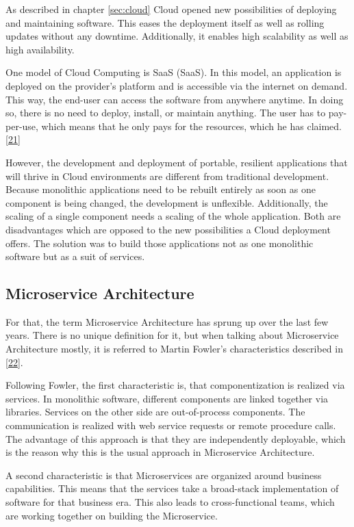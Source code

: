 \documentclass[12pt,english,a4paper,oneside,,tablecaptionabove]{scrbook}
\begin{document}
As described in chapter \ref{sec:cloud} Cloud opened new possibilities
of deploying and maintaining software. This eases the deployment itself
as well as rolling updates without any downtime. Additionally, it
enables high scalability as well as high availability.

One model of Cloud Computing is \acl{SaaS} (\acs{SaaS}). In this model,
an application is deployed on the provider's platform and is accessible
via the internet on demand. This way, the end-user can access the
software from anywhere anytime. In doing so, there is no need to deploy,
install, or maintain anything. The user has to pay-per-use, which means
that he only pays for the resources, which he has claimed.
{[}\protect\hyperlink{ref-Kumar2014}{21}{]}

However, the development and deployment of portable, resilient
applications that will thrive in Cloud environments are different from
traditional development. Because monolithic applications need to be
rebuilt entirely as soon as one component is being changed, the
development is unflexible. Additionally, the scaling of a single
component needs a scaling of the whole application. Both are
disadvantages which are opposed to the new possibilities a Cloud
deployment offers. The solution was to build those applications not as
one monolithic software but as a suit of services.

\hypertarget{microservice-architecture}{%
\subsection{Microservice Architecture}\label{microservice-architecture}}

For that, the term Microservice Architecture has sprung up over the last
few years. There is no unique definition for it, but when talking about
Microservice Architecture mostly, it is referred to Martin Fowler's
characteristics described in
{[}\protect\hyperlink{ref-MartinFowler}{22}{]}.

Following Fowler, the first characteristic is, that componentization is
realized via services. In monolithic software, different components are
linked together via libraries. Services on the other side are
out-of-process components. The communication is realized with web
service requests or remote procedure calls. The advantage of this
approach is that they are independently deployable, which is the reason
why this is the usual approach in Microservice Architecture.

A second characteristic is that Microservices are organized around
business capabilities. This means that the services take a broad-stack
implementation of software for that business era. This also leads to
cross-functional teams, which are working together on building the
Microservice.
\end{document}
